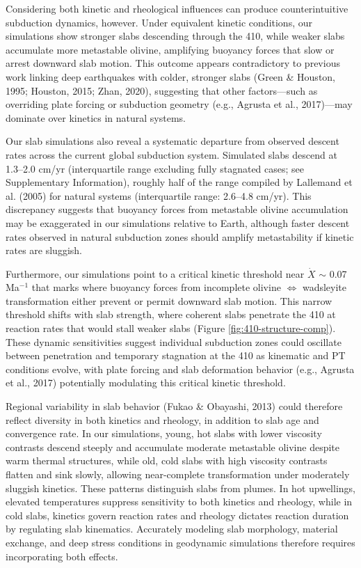 \documentclass[draft,linenumbers]{agujournal2019}
\begin{document}
Considering both kinetic and rheological influences can produce
counterintuitive subduction dynamics, however. Under equivalent kinetic
conditions, our simulations show stronger slabs descending through the
410, while weaker slabs accumulate more metastable olivine, amplifying
buoyancy forces that slow or arrest downward slab motion. This outcome
appears contradictory to previous work linking deep earthquakes with
colder, stronger slabs (Green \& Houston, 1995; Houston, 2015; Zhan,
2020), suggesting that other factors---such as overriding plate forcing
or subduction geometry (e.g., Agrusta et al., 2017)---may dominate over
kinetics in natural systems.

Our slab simulations also reveal a systematic departure from observed
descent rates across the current global subduction system. Simulated
slabs descend at 1.3--2.0 cm/yr (interquartile range excluding fully
stagnated cases; see Supplementary Information), roughly half of the
range compiled by Lallemand et al. (2005) for natural systems
(interquartile range: 2.6--4.8 cm/yr). This discrepancy suggests that
buoyancy forces from metastable olivine accumulation may be exaggerated
in our simulations relative to Earth, although faster descent rates
observed in natural subduction zones should amplify metastability if
kinetic rates are sluggish.

Furthermore, our simulations point to a critical kinetic threshold near
\(\dot{X}\) \(\sim\) 0.07 Ma\(^{-1}\) that marks where buoyancy forces
from incomplete olivine \(\Leftrightarrow\) wadsleyite transformation
either prevent or permit downward slab motion. This narrow threshold
shifts with slab strength, where coherent slabs penetrate the 410 at
reaction rates that would stall weaker slabs (Figure
\ref{fig:410-structure-comp}). These dynamic sensitivities suggest
individual subduction zones could oscillate between penetration and
temporary stagnation at the 410 as kinematic and PT conditions evolve,
with plate forcing and slab deformation behavior (e.g., Agrusta et al.,
2017) potentially modulating this critical kinetic threshold.

Regional variability in slab behavior (Fukao \& Obayashi, 2013) could
therefore reflect diversity in both kinetics and rheology, in addition
to slab age and convergence rate. In our simulations, young, hot slabs
with lower viscosity contrasts descend steeply and accumulate moderate
metastable olivine despite warm thermal structures, while old, cold
slabs with high viscosity contrasts flatten and sink slowly, allowing
near-complete transformation under moderately sluggish kinetics. These
patterns distinguish slabs from plumes. In hot upwellings, elevated
temperatures suppress sensitivity to both kinetics and rheology, while
in cold slabs, kinetics govern reaction rates and rheology dictates
reaction duration by regulating slab kinematics. Accurately modeling
slab morphology, material exchange, and deep stress conditions in
geodynamic simulations therefore requires incorporating both effects.
\end{document}

